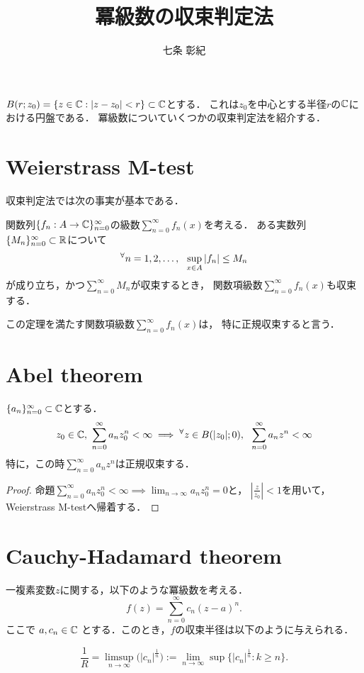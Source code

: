 \documentclass[a4paper]{jsarticle}
\title{冪級数の収束判定法}
\author{七条 彰紀}
\begin{document}
    \maketitle

    $B(r;z_0)=\{ z \in \mathbb{C} : |z-z_0|<r \} \subset \mathbb{C}$とする．
    これは$z_0$を中心とする半径$r$の$\mathbb{C}$における円盤である．
    冪級数についていくつかの収束判定法を紹介する．

    \section{Weierstrass M-test}
    収束判定法では次の事実が基本である．
    \begin{Thm}
        関数列$\{f_n: A \to \mathbb{C}\}_{n=0}^{\infty}$の級数$\sum_{n=0}^{\infty} f_n(x)$を考える．
        ある実数列$\{M_n\}_{n=0}^{\infty} \subset \mathbb{R}$について
        \[ {}^{\forall} n=1,2,\dots,~~ \sup_{x \in A} |f_n| \leq M_n \]
        が成り立ち，かつ$\sum_{n=0}^{\infty} M_n$が収束するとき，
        関数項級数$\sum_{n=0}^{\infty} f_n(x)$も収束する．
    \end{Thm}
    この定理を満たす関数項級数$\sum_{n=0}^{\infty} f_n(x)$は，
    特に正規収束すると言う．

    \section{Abel theorem}
        \begin{Thm}
            $\{a_n\}_{n=0}^{\infty} \subset \mathbb{C}$とする．
            \[
                z_0 \in \mathbb{C},~ \sum_{n=0}^{\infty}{a_n z^n_0} < \infty
                \implies
                {}^{\forall} z \in B(|z_0|; 0),~~ \sum_{n=0}^{\infty}{a_n z^n} < \infty
            \]
            特に，この時$\sum_{n=0}^{\infty}{a_n z^n}$は正規収束する．
        \end{Thm}
        \begin{proof}
            命題$\sum_{n=0}^{\infty}{a_n z^n_0} < \infty \implies \lim_{n \to \infty}{a_n z^n_0}=0$と，
            $|\frac{z}{z_0}|<1$を用いて，Weierstrass M-testへ帰着する．
        \end{proof}

    \section{Cauchy-Hadamard theorem}
        \begin{Thm}
        一複素変数$z$に関する，以下のような冪級数を考える．
        \[ f(z) = \sum_{n = 0}^{\infty} c_{n} (z-a)^{n}. \]
        ここで $a, c_n \in \mathbb{C}$ とする．このとき，$f$の収束半径は以下のように与えられる．

        \[
            \frac{1}{R}=\limsup_{n \to \infty} \big( | c_{n} |^\frac{1}{n} \big)
            :=\lim_{n\to\infty}\sup\{| c_{n} |^\frac{1}{n} : k\geq n\}.\]
        \end{Thm}
\end{document}
